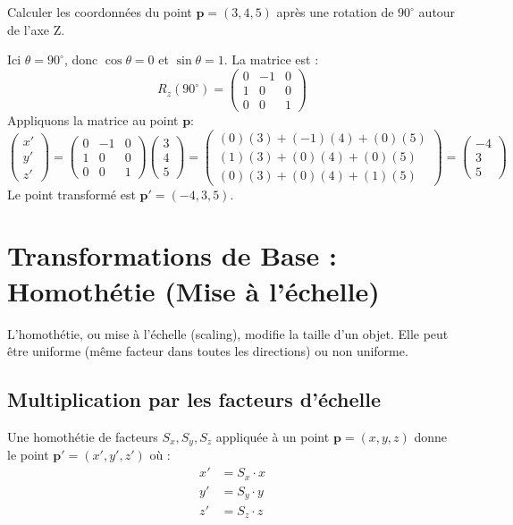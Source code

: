 \begin{example}[Rotation 3D]
Calculer les coordonnées du point \( \mathbf{p} = (3, 4, 5) \) après une rotation de \( 90^\circ \) autour de l'axe Z.
\begin{solution}
Ici \( \theta = 90^\circ \), donc \( \cos \theta = 0 \) et \( \sin \theta = 1 \). La matrice est :
\[ R_z(90^\circ) = \begin{pmatrix} 0 & -1 & 0 \\ 1 & 0 & 0 \\ 0 & 0 & 1 \end{pmatrix} \]
Appliquons la matrice au point \( \mathbf{p} \):
\[ \begin{pmatrix} x' \\ y' \\ z' \end{pmatrix} = \begin{pmatrix} 0 & -1 & 0 \\ 1 & 0 & 0 \\ 0 & 0 & 1 \end{pmatrix} \begin{pmatrix} 3 \\ 4 \\ 5 \end{pmatrix} = \begin{pmatrix} (0)(3) + (-1)(4) + (0)(5) \\ (1)(3) + (0)(4) + (0)(5) \\ (0)(3) + (0)(4) + (1)(5) \end{pmatrix} = \begin{pmatrix} -4 \\ 3 \\ 5 \end{pmatrix} \]
Le point transformé est \( \mathbf{p'} = (-4, 3, 5) \).
\end{solution}
\end{example}
\section{Transformations de Base : Homothétie (Mise à l'échelle)}
L'homothétie, ou mise à l'échelle (scaling), modifie la taille d'un objet. Elle peut être uniforme (même facteur dans toutes les directions) ou non uniforme.
\subsection{Multiplication par les facteurs d'échelle}
Une homothétie de facteurs \( S_x, S_y, S_z \) appliquée à un point \( \mathbf{p} = (x, y, z) \) donne le point \( \mathbf{p'} = (x', y', z') \) où :
\begin{align*} x' &= S_x \cdot x \\ y' &= S_y \cdot y \\ z' &= S_z \cdot z \end{align*}
